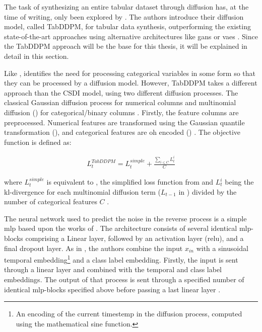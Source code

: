 The task of synthesizing an entire tabular dataset through diffusion has, at the time of writing, only been explored by \textcite{kotelnikov2022TabDDPMModellingTabular}.
The authors introduce their diffusion \gls{model}, called TabDDPM, for tabular data synthesis, outperforming the existing state-of-the-art approaches using alternative architectures like \glspl{gan} or \glspl{vae} \cite{kotelnikov2022TabDDPMModellingTabular}. 
Since the TabDDPM approach will be the base for this thesis, it will be explained in detail in this section.

Like \textcite{zheng2022DiffusionModelsMissing}, \textcite{kotelnikov2022TabDDPMModellingTabular} identifies the need for processing categorical variables in some form so that they can be processed by a diffusion \gls{model}.
However, TabDDPM takes a different approach than the CSDI \gls{model}, using two different diffusion processes.
The classical Gaussian diffusion process \cite{ho2020DenoisingDiffusionProbabilistic} for numerical columns and multinomial diffusion \cite{hoogeboom2021ArgmaxFlowsMultinomial} () for categorical/binary columns \cite{zheng2022DiffusionModelsMissing}.
Firstly, the feature columns are preprocessed.
Numerical features are transformed using the Gaussian quantile transformation (), and categorical features are \gls{oh} encoded () \cite{kotelnikov2022TabDDPMModellingTabular}.
The objective function is defined as:

\begin{equation}
    \label{eqn:tabddpm_loss}
    \begin{align*}
        L^{TabDDPM}_{t} =L^{simple}_t + \frac{\sum_{i \leq C}^{}L^i_{t}}{C}
    \end{align*}
\end{equation}

where $L^{simple}_t$ is equivalent to , the simplified loss function from \textcite{ho2020DenoisingDiffusionProbabilistic} and $L^i_{t}$ being the \gls{kl}-divergence for each multinomial diffusion term ($L_{t-1}$ in ) divided by the number of categorical features $C$ \cite{kotelnikov2022TabDDPMModellingTabular}.

The neural network used to predict the noise in the reverse process is a simple \gls{mlp} based upon the works of \cite{gorishniy2021RevisitingDeepLearning}.
The architecture consists of several identical \gls{mlp}-blocks comprising a Linear layer, followed by an activation layer (\gls{relu}), and a final dropout layer. 
As in \cite{nichol2021ImprovedDenoisingDiffusion, dhariwal2021DiffusionModelsBeat}, the authors combine the input $x_{in}$ with a sinusoidal temporal embedding\footnote{An encoding of the current timestemp in the diffusion process, computed using the mathematical sine function.} and a class label embedding.
Firstly, the input is sent through a linear layer and combined with the temporal and class label embeddings.
The output of that process is sent through a specified number of identical \gls{mlp}-blocks specified above before passing a last linear layer \cite{kotelnikov2022TabDDPMModellingTabular}.

